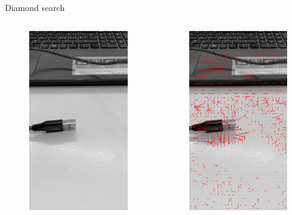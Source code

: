 \documentclass[aspectratio=1610,xcolor=dvipsnames]{beamer}
\begin{document}
\begin{frame}{Diamond search}
	
	\begin{columns}
		\begin{column}{0.5\textwidth}
			\begin{figure}
				\centering
				\includegraphics[keepaspectratio, width=.5\linewidth]{images/bbme-im.png}
			\end{figure}
		\end{column}
		\begin{column}{0.5\textwidth}
			\begin{figure}
				\centering
				\includegraphics[keepaspectratio, width=.5\linewidth]{images/bbme-3-res.png}
			\end{figure}
		\end{column}
	\end{columns}
\end{frame}
\end{document}
